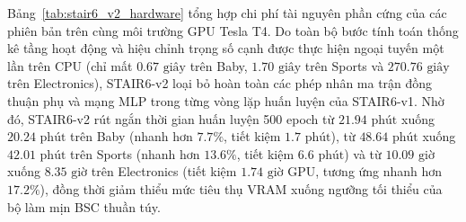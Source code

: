\begin{table}[H]
\centering
\small
\setlength{\tabcolsep}{4pt}
\renewcommand{\arraystretch}{1.15}
\caption{So sánh mức tiêu thụ VRAM, thời gian huấn luyện và số tham số bổ sung trên GPU Tesla T4 giữa STAIR Baseline, STAIR6-v1 (BSCV) và STAIR6-v2 (PEEC).}
\label{tab:stair6_v2_hardware}
\end{table}

Bảng~\ref{tab:stair6_v2_hardware} tổng hợp chi phí tài nguyên phần cứng của các phiên bản trên cùng môi trường GPU Tesla T4. Do toàn bộ bước tính toán thống kê tầng hoạt động và hiệu chỉnh trọng số cạnh được thực hiện ngoại tuyến một lần trên CPU (chỉ mất $0.67\text{ giây}$ trên Baby, $1.70\text{ giây}$ trên Sports và $270.76\text{ giây}$ trên Electronics), STAIR6-v2 loại bỏ hoàn toàn các phép nhân ma trận đồng thuận phụ và mạng MLP trong từng vòng lặp huấn luyện của STAIR6-v1. Nhờ đó, STAIR6-v2 rút ngắn thời gian huấn luyện 500 epoch từ $21.94\text{ phút}$ xuống $20.24\text{ phút}$ trên Baby (nhanh hơn $7.7\%$, tiết kiệm $1.7\text{ phút}$), từ $48.64\text{ phút}$ xuống $42.01\text{ phút}$ trên Sports (nhanh hơn $13.6\%$, tiết kiệm $6.6\text{ phút}$) và từ $10.09\text{ giờ}$ xuống $8.35\text{ giờ}$ trên Electronics (tiết kiệm $1.74\text{ giờ}$ GPU, tương ứng nhanh hơn $17.2\%$), đồng thời giảm thiểu mức tiêu thụ VRAM xuống ngưỡng tối thiểu của bộ làm mịn BSC thuần túy.

\clearpage